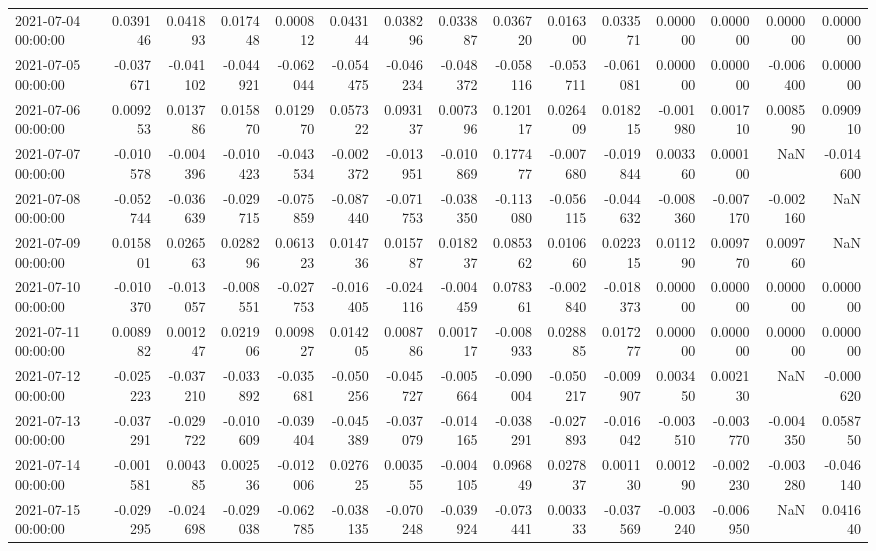 \begin{tabular}{lrrrrrrrrrrrrrr}
2021-07-04 00:00:00 & 0.039146 & 0.041893 & 0.017448 & 0.000812 & 0.043144 & 0.038296 & 0.033887 & 0.036720 & 0.016300 & 0.033571 & 0.000000 & 0.000000 & 0.000000 & 0.000000 \\
2021-07-05 00:00:00 & -0.037671 & -0.041102 & -0.044921 & -0.062044 & -0.054475 & -0.046234 & -0.048372 & -0.058116 & -0.053711 & -0.061081 & 0.000000 & 0.000000 & -0.006400 & 0.000000 \\
2021-07-06 00:00:00 & 0.009253 & 0.013786 & 0.015870 & 0.012970 & 0.057322 & 0.093137 & 0.007396 & 0.120117 & 0.026409 & 0.018215 & -0.001980 & 0.001710 & 0.008590 & 0.090910 \\
2021-07-07 00:00:00 & -0.010578 & -0.004396 & -0.010423 & -0.043534 & -0.002372 & -0.013951 & -0.010869 & 0.177477 & -0.007680 & -0.019844 & 0.003360 & 0.000100 & NaN & -0.014600 \\
2021-07-08 00:00:00 & -0.052744 & -0.036639 & -0.029715 & -0.075859 & -0.087440 & -0.071753 & -0.038350 & -0.113080 & -0.056115 & -0.044632 & -0.008360 & -0.007170 & -0.002160 & NaN \\
2021-07-09 00:00:00 & 0.015801 & 0.026563 & 0.028296 & 0.061323 & 0.014736 & 0.015787 & 0.018237 & 0.085362 & 0.010660 & 0.022315 & 0.011290 & 0.009770 & 0.009760 & NaN \\
2021-07-10 00:00:00 & -0.010370 & -0.013057 & -0.008551 & -0.027753 & -0.016405 & -0.024116 & -0.004459 & 0.078361 & -0.002840 & -0.018373 & 0.000000 & 0.000000 & 0.000000 & 0.000000 \\
2021-07-11 00:00:00 & 0.008982 & 0.001247 & 0.021906 & 0.009827 & 0.014205 & 0.008786 & 0.001717 & -0.008933 & 0.028885 & 0.017277 & 0.000000 & 0.000000 & 0.000000 & 0.000000 \\
2021-07-12 00:00:00 & -0.025223 & -0.037210 & -0.033892 & -0.035681 & -0.050256 & -0.045727 & -0.005664 & -0.090004 & -0.050217 & -0.009907 & 0.003450 & 0.002130 & NaN & -0.000620 \\
2021-07-13 00:00:00 & -0.037291 & -0.029722 & -0.010609 & -0.039404 & -0.045389 & -0.037079 & -0.014165 & -0.038291 & -0.027893 & -0.016042 & -0.003510 & -0.003770 & -0.004350 & 0.058750 \\
2021-07-14 00:00:00 & -0.001581 & 0.004385 & 0.002536 & -0.012006 & 0.027625 & 0.003555 & -0.004105 & 0.096849 & 0.027837 & 0.001130 & 0.001290 & -0.002230 & -0.003280 & -0.046140 \\
2021-07-15 00:00:00 & -0.029295 & -0.024698 & -0.029038 & -0.062785 & -0.038135 & -0.070248 & -0.039924 & -0.073441 & 0.003333 & -0.037569 & -0.003240 & -0.006950 & NaN & 0.041640 \\

\end{tabular}
